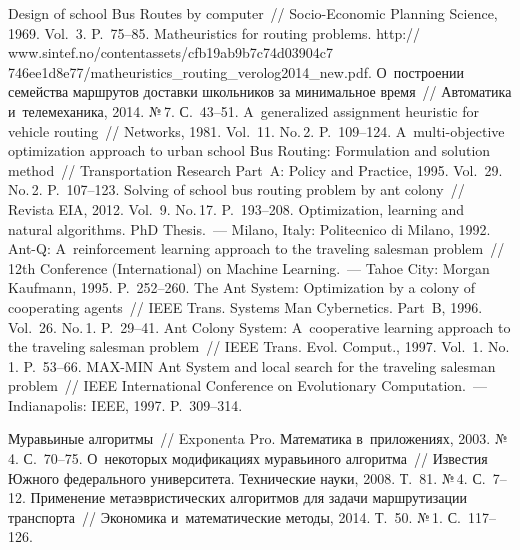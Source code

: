 \begin{multicols}{2}
{\small\frenchspacing
 {%
 \begin{thebibliography}{99}
 Design of school Bus Routes by computer~//
Socio-Economic Planning Science, 1969. Vol.~3. P.~75--85.
 Matheuristics for routing problems. {\sf
http:// www.sintef.no/contentassets/cfb19ab9b7c74d03904c7\linebreak
746ee1d8e77/matheuristics\_routing\_verolog2014\_new.\linebreak pdf}.
 О~построении
семейства маршрутов доставки школьников за минимальное время~//
Автоматика и~телемеханика, 2014. №\,7. С.~43--51.
 A~generalized assignment heuristic for vehicle
routing~// Networks, 1981. Vol.~11. No.\,2. P.~109--124.
 A~multi-objective optimization approach to
urban school Bus Routing: Formulation and solution method~// Transportation
Research Part~A: Policy and Practice, 1995. Vol.~29. No.\,2. P.~107--123.
 Solving of school bus
routing problem by ant colony~// Revista EIA, 2012. Vol.~9. No.\,17. P.~193--208.
 Optimization, learning and natural algorithms. PhD Thesis.~---
Milano, Italy: Politecnico di Milano, 1992.
 Ant-Q: A~reinforcement learning approach to
the traveling salesman problem~// 12th Conference (International) on Machine
Learning.~--- Tahoe City: Morgan Kaufmann, 1995. P.~252--260.
 The Ant System: Optimization by a
colony of cooperating agents~// IEEE Trans. Systems Man Cybernetics. Part~B,
1996. Vol.~26. No.\,1. P.~29--41.
 Ant Colony System: A~cooperative learning
approach to the traveling salesman problem~// IEEE Trans. Evol.
Comput., 1997. Vol.~1. No.\,1. P.~53--66.
 MAX-MIN Ant System and local search
for the traveling salesman problem~// IEEE International Conference on Evolutionary
Computation.~--- Indianapolis: IEEE, 1997. P.~309--314.

 Муравьиные алгоритмы~// Exponenta Pro. Математика в~приложениях, 2003. №\,4. С.~70--75.
 О~некоторых модификациях
муравьиного алгоритма~// Известия Южного федерального университета.
Технические науки, 2008. Т.~81. №\,4. С.~7--12.
 Применение метаэвристических алгоритмов для задачи
маршрутизации транспорта~// Экономика и~математические методы, 2014.
Т.~50. №\,1. С.~117--126.

 \end{thebibliography}

 }
 }

\end{multicols}

